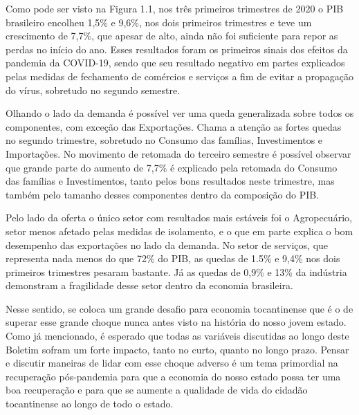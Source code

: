 \begin{figure}[!h]
\begin{subfigure}{\linewidth}
	\end{subfigure}
\end{figure}
\par Como pode ser visto na Figura 1.1, nos três primeiros trimestres de 2020 o PIB brasileiro encolheu 1,5\% e 9,6\%, nos dois primeiros trimestres e teve um crescimento de 7,7\%, que apesar de alto, ainda não foi suficiente para repor as perdas no início do ano. Esses resultados foram os primeiros sinais dos efeitos da pandemia da COVID-19, sendo que seu resultado negativo em partes explicados pelas medidas de fechamento de comércios e serviços a fim de evitar a propagação do vírus, sobretudo no segundo semestre.
\par Olhando o lado da demanda é possível ver uma queda generalizada sobre todos os componentes, com exceção das Exportações. Chama a atenção as fortes quedas no segundo trimestre, sobretudo no Consumo das famílias, Investimentos e Importações. No movimento de retomada do terceiro semestre é possível observar que grande parte do aumento de 7,7\% é explicado pela retomada do Consumo das famílias e Investimentos, tanto pelos bons resultados neste trimestre, mas também pelo tamanho desses componentes dentro da composição do PIB.
\par Pelo lado da oferta o único setor com resultados mais estáveis foi o Agropecuário, setor menos afetado pelas medidas de isolamento, e o que em parte explica o bom desempenho das exportações no lado da demanda. No setor de serviços, que representa nada menos do que 72\% do PIB, as quedas de 1.5\% e 9,4\% nos dois primeiros trimestres pesaram bastante. Já as quedas de 0,9\% e 13\% da indústria demonstram a fragilidade desse setor dentro da economia brasileira.
\par Nesse sentido, se coloca um grande desafio para economia tocantinense que é o de superar esse grande choque nunca antes visto na história do nosso jovem estado. Como já mencionado, é esperado que todas as variáveis discutidas ao longo deste Boletim sofram um forte impacto, tanto no curto, quanto no longo prazo. Pensar e discutir maneiras de lidar com esse choque adverso é um tema primordial na recuperação pós-pandemia para que a economia do nosso estado possa ter uma boa recuperação e para que se aumente a qualidade de vida do cidadão tocantinense ao longo de todo o estado. 
